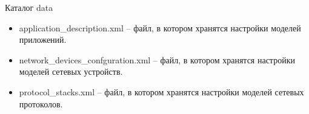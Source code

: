     Каталог data

    \begin{itemize}
        \item application\_description.xml -- файл, в котором хранятся настройки моделей приложений.
        \item network\_devices\_confguration.xml -- файл, в котором хранятся настройки моделей сетевых устройств.
        \item protocol\_stacks.xml -- файл, в котором хранятся настройки моделей сетевых протоколов.
    \end{itemize}
